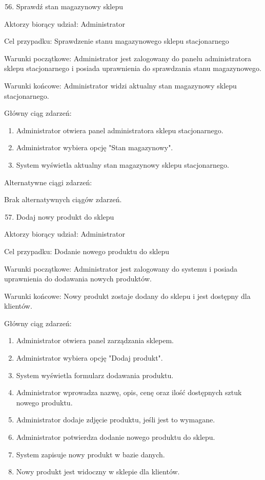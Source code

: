 \documentclass[
]{article}
\providecommand{\tightlist}{%
  \setlength{\itemsep}{0pt}\setlength{\parskip}{0pt}}
\begin{document}
{}

\begin{enumerate}
\setcounter{enumi}{55}
\tightlist
\item
  {Sprawdź stan magazynowy sklepu}
\end{enumerate}

{Aktorzy biorący udział: Administrator}

{Cel przypadku: Sprawdzenie stanu magazynowego sklepu stacjonarnego}

{Warunki początkowe: Administrator jest zalogowany do panelu
administratora sklepu stacjonarnego i posiada uprawnienia do sprawdzania
stanu magazynowego.}

{Warunki końcowe: Administrator widzi aktualny stan magazynowy sklepu
stacjonarnego.}

{Główny ciąg zdarzeń:}

\begin{enumerate}
\tightlist
\item
  {Administrator otwiera panel administratora sklepu stacjonarnego.}
\item
  {Administrator wybiera opcję "Stan magazynowy".}
\item
  {System wyświetla aktualny stan magazynowy sklepu stacjonarnego.}
\end{enumerate}

{Alternatywne ciągi zdarzeń:}

{Brak alternatywnych ciągów zdarzeń.}

{}

\begin{enumerate}
\setcounter{enumi}{56}
\tightlist
\item
  {Dodaj nowy produkt do sklepu}
\end{enumerate}

{Aktorzy biorący udział: Administrator}

{Cel przypadku: Dodanie nowego produktu do sklepu}

{Warunki początkowe: Administrator jest zalogowany do systemu i posiada
uprawnienia do dodawania nowych produktów.}

{Warunki końcowe: Nowy produkt zostaje dodany do sklepu i jest dostępny
dla klientów.}

{Główny ciąg zdarzeń:}

\begin{enumerate}
\tightlist
\item
  {Administrator otwiera panel zarządzania sklepem.}
\item
  {Administrator wybiera opcję "Dodaj produkt".}
\item
  {System wyświetla formularz dodawania produktu.}
\item
  {Administrator wprowadza nazwę, opis, cenę oraz ilość dostępnych sztuk
  nowego produktu.}
\item
  {Administrator dodaje zdjęcie produktu, jeśli jest to wymagane.}
\item
  {Administrator potwierdza dodanie nowego produktu do sklepu.}
\item
  {System zapisuje nowy produkt w bazie danych.}
\item
  {Nowy produkt jest widoczny w sklepie dla klientów.}
\end{enumerate}
\end{document}
